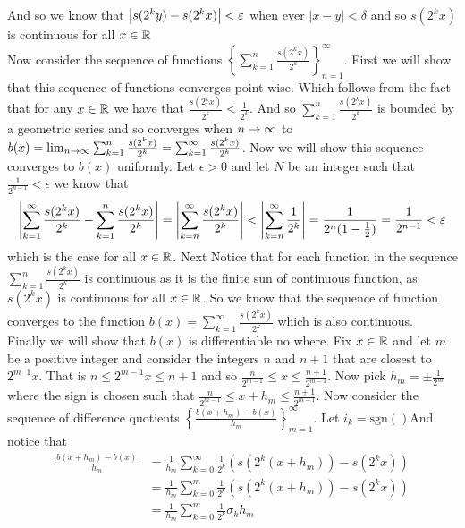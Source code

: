 \documentclass[12pt]{amsart}
\begin{document}
\begin{itemize}
      And so we know that $\left\vert s(2^ky)-s(2^kx) \right\vert<\varepsilon$ when ever $|x-y|<\delta$
      and so $s(2^kx)$ is continuous for all $x\in \mathbb{R}$\\

      Now consider the sequence of functions
      $\displaystyle{\left\{\sum_{k=1}^n\frac{s(2^kx)}{2^k}\right\}_{n=1}^{\infty}}$.
      First we will show that this sequence of functions converges point wise. 
      Which follows from the fact that for any $x\in \mathbb{R}$ we have that 
      $\frac{s(2^kx)}{2^k}\leq \frac{1}{2^k}$. And so $\sum_{k=1}^n\frac{s(2^kx)}{2^k}$ 
      is bounded by a geometric series and so converges when $n\rightarrow\infty$ to 
      $b(x)=\lim_{n\rightarrow\infty}\sum_{k=1}^n\frac{s(2^kx)}{2^k}=\sum_{k=1}^\infty\frac{s(2^kx)}{2^k}$. 
      Now we will show this sequence converges to $b(x)$ uniformly. Let
      $\epsilon>0$ and let $N$ be an integer such that $\frac{1}{2^{n-1}}<\epsilon$
      we know that
      \[\left\vert \sum_{k=1}^\infty\frac{s(2^kx)}{2^k}-\sum_{k=1}^n\frac{s(2^kx)}{2^k} \right\vert=\left\vert \sum_{k=n}^\infty\frac{s(2^kx)}{2^k} \right\vert<\left\vert \sum_{k=n}^\infty\frac{1}{2^k} \right\vert=\frac{1}{2^n(1-\frac{1}{2})}=\frac{1}{2^{n-1}}<\varepsilon\]
      which is the case for all $x\in\mathbb{R}$. Next Notice that for each function in the
      sequence $\sum_{k=1}^n\frac{s(2^kx)}{2^k}$ is continuous as it is the finite
      sun of continuous function, as $s(2^kx)$ is continuous for all $x\in\mathbb{R}$. So we
      know that the sequence of function converges to the function
      $b(x)=\sum_{k=1}^\infty\frac{s(2^kx)}{2^k}$ which is also continuous.\\

      Finally we will show that $b(x)$ is differentiable no where.
      Fix $x\in \mathbb{R}$ and let $m$ be a positive integer and consider the integers $n$ and $n+1$ that are closest to $2^{m^-1}x$. 
      That is $n\leq 2^{m-1}x\leq n+1$ and so $\frac{n}{2^{m-1}}\leq x\leq \frac{n+1}{2^{m-1}}$. Now pick $h_m=\pm\frac{1}{2^m}$ 
      where the sign is chosen such that $\frac{n}{2^{m-1}}\leq x+h_m\leq \frac{n+1}{2^{m-1}}$.
      Now consider the sequence of difference quotients $\left\{\frac{b(x+h_m)-b(x)}{h_m}\right\}_{m=1}^\infty$. Let $i_k=\text{sgn}()$And notice that 
      \begin{align}
         \frac{b(x+h_m)-b(x)}{h_m}&=\frac{1}{h_m}\sum_{k=0}^{\infty}\frac{1}{2^k}\left(s(2^k(x+h_m))-s(2^kx)\right)\\
         &=\frac{1}{h_m}\sum_{k=0}^{m}\frac{1}{2^k}\left(s(2^k(x+h_m))-s(2^kx)\right)\\
         &=\frac{1}{h_m}\sum_{k=0}^{m}\frac{1}{2^k}\sigma_k h_m
      \end{align}



\end{itemize}
\end{document}

